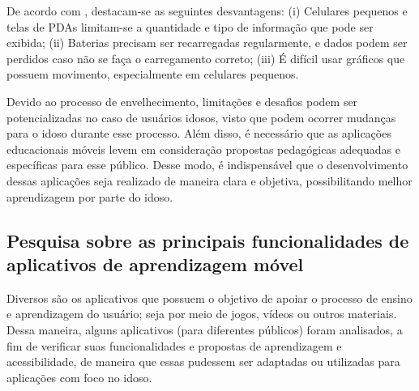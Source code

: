 De acordo com \cite{RICHAMEHTA2016}, destacam-se as seguintes desvantagens: (i) Celulares pequenos e telas de PDAs limitam-se a quantidade e tipo de informação que pode ser exibida; (ii) Baterias precisam ser recarregadas regularmente, e dados podem ser perdidos caso não se faça o carregamento correto; (iii) É difícil usar gráficos que possuem movimento, especialmente em celulares pequenos.

Devido ao processo de envelhecimento, limitações e desafios podem ser potencializadas no caso de usuários idosos, visto que podem ocorrer mudanças para o idoso durante esse processo. Além disso, é necessário que as aplicações educacionais móveis levem em consideração propostas pedagógicas adequadas e específicas para esse público. Desse modo, é indispensável que o desenvolvimento dessas aplicações seja realizado de maneira clara e objetiva, possibilitando melhor aprendizagem por parte do idoso.

\subsection{Pesquisa sobre as principais funcionalidades de aplicativos de aprendizagem móvel}
Diversos são os aplicativos que possuem o objetivo de apoiar o processo de ensino e aprendizagem do usuário; seja por meio de jogos, vídeos ou outros materiais. Dessa maneira, alguns aplicativos (para diferentes públicos) foram analisados, a fim de verificar suas funcionalidades e propostas de aprendizagem e acessibilidade, de maneira que essas pudessem ser adaptadas ou utilizadas para aplicações com foco no idoso.

